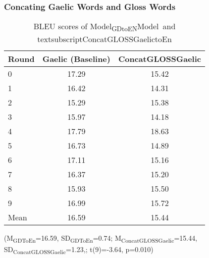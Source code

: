 \documentclass[a4paper]{article}
\begin{document}
\subsubsection{Concating Gaelic Words and Gloss Words}\label{treatment:Concating}
\begin{table}[ht]
\centering
\begin{tabular}{lcc}
  \hline
Round & Gaelic (Baseline) & ConcatGLOSSGaelic \\ 
  \hline
0 & 17.29 & 15.42 \\ 
  1 & 16.42 & 14.31 \\ 
  2 & 15.29 & 15.38 \\ 
  3 & 15.97 & 14.18 \\ 
  4 & 17.79 & 18.63 \\ 
  5 & 16.73 & 14.89 \\ 
  6 & 17.11 & 15.16 \\ 
  7 & 16.37 & 15.20 \\ 
  8 & 15.93 & 15.50 \\ 
  9 & 16.99 & 15.72 \\ 
   \hline
Mean & 16.59 & 15.44 \\ 
   \hline
\end{tabular}
\caption{BLEU scores of Model\textsubscript{GDtoEN}Model\ and textsubscript{ConcatGLOSSGaelictoEn} } 
\label{Table:Concating}
\end{table}(M\textsubscript{GDToEn}=16.59, SD\textsubscript{GDToEn}=0.74; M\textsubscript{ConcatGLOSSGaelic}=15.44, SD\textsubscript{ConcatGLOSSGaelic}=1.23,; t(9)=-3.64, p=0.010)

\end{document}
